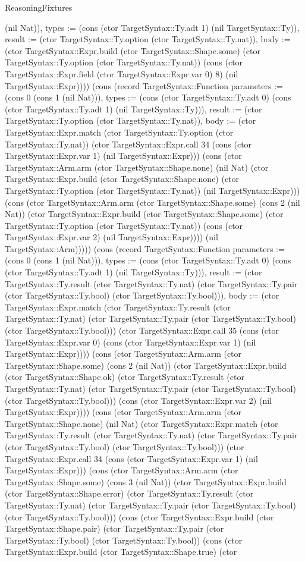 \begin{lexlean}{ReasoningFixtures}
\begin{semanticmodule}
{(nil Nat)), types := (cons (ctor TargetSyntax::Ty.adt 1) (nil TargetSyntax::Ty)), result := (ctor TargetSyntax::Ty.option (ctor TargetSyntax::Ty.nat)), body := (ctor TargetSyntax::Expr.build (ctor TargetSyntax::Shape.some) (ctor TargetSyntax::Ty.option (ctor TargetSyntax::Ty.nat)) (cons (ctor TargetSyntax::Expr.field (ctor TargetSyntax::Expr.var 0) 8) (nil TargetSyntax::Expr)))}) (cons (record TargetSyntax::Function {parameters := (cons 0 (cons 1 (nil Nat))), types := (cons (ctor TargetSyntax::Ty.adt 0) (cons (ctor TargetSyntax::Ty.adt 1) (nil TargetSyntax::Ty))), result := (ctor TargetSyntax::Ty.option (ctor TargetSyntax::Ty.nat)), body := (ctor TargetSyntax::Expr.match (ctor TargetSyntax::Ty.option (ctor TargetSyntax::Ty.nat)) (ctor TargetSyntax::Expr.call 34 (cons (ctor TargetSyntax::Expr.var 1) (nil TargetSyntax::Expr))) (cons (ctor TargetSyntax::Arm.arm (ctor TargetSyntax::Shape.none) (nil Nat) (ctor TargetSyntax::Expr.build (ctor TargetSyntax::Shape.none) (ctor TargetSyntax::Ty.option (ctor TargetSyntax::Ty.nat)) (nil TargetSyntax::Expr))) (cons (ctor TargetSyntax::Arm.arm (ctor TargetSyntax::Shape.some) (cons 2 (nil Nat)) (ctor TargetSyntax::Expr.build (ctor TargetSyntax::Shape.some) (ctor TargetSyntax::Ty.option (ctor TargetSyntax::Ty.nat)) (cons (ctor TargetSyntax::Expr.var 2) (nil TargetSyntax::Expr)))) (nil TargetSyntax::Arm))))}) (cons (record TargetSyntax::Function {parameters := (cons 0 (cons 1 (nil Nat))), types := (cons (ctor TargetSyntax::Ty.adt 0) (cons (ctor TargetSyntax::Ty.adt 1) (nil TargetSyntax::Ty))), result := (ctor TargetSyntax::Ty.result (ctor TargetSyntax::Ty.nat) (ctor TargetSyntax::Ty.pair (ctor TargetSyntax::Ty.bool) (ctor TargetSyntax::Ty.bool))), body := (ctor TargetSyntax::Expr.match (ctor TargetSyntax::Ty.result (ctor TargetSyntax::Ty.nat) (ctor TargetSyntax::Ty.pair (ctor TargetSyntax::Ty.bool) (ctor TargetSyntax::Ty.bool))) (ctor TargetSyntax::Expr.call 35 (cons (ctor TargetSyntax::Expr.var 0) (cons (ctor TargetSyntax::Expr.var 1) (nil TargetSyntax::Expr)))) (cons (ctor TargetSyntax::Arm.arm (ctor TargetSyntax::Shape.some) (cons 2 (nil Nat)) (ctor TargetSyntax::Expr.build (ctor TargetSyntax::Shape.ok) (ctor TargetSyntax::Ty.result (ctor TargetSyntax::Ty.nat) (ctor TargetSyntax::Ty.pair (ctor TargetSyntax::Ty.bool) (ctor TargetSyntax::Ty.bool))) (cons (ctor TargetSyntax::Expr.var 2) (nil TargetSyntax::Expr)))) (cons (ctor TargetSyntax::Arm.arm (ctor TargetSyntax::Shape.none) (nil Nat) (ctor TargetSyntax::Expr.match (ctor TargetSyntax::Ty.result (ctor TargetSyntax::Ty.nat) (ctor TargetSyntax::Ty.pair (ctor TargetSyntax::Ty.bool) (ctor TargetSyntax::Ty.bool))) (ctor TargetSyntax::Expr.call 34 (cons (ctor TargetSyntax::Expr.var 1) (nil TargetSyntax::Expr))) (cons (ctor TargetSyntax::Arm.arm (ctor TargetSyntax::Shape.some) (cons 3 (nil Nat)) (ctor TargetSyntax::Expr.build (ctor TargetSyntax::Shape.error) (ctor TargetSyntax::Ty.result (ctor TargetSyntax::Ty.nat) (ctor TargetSyntax::Ty.pair (ctor TargetSyntax::Ty.bool) (ctor TargetSyntax::Ty.bool))) (cons (ctor TargetSyntax::Expr.build (ctor TargetSyntax::Shape.pair) (ctor TargetSyntax::Ty.pair (ctor TargetSyntax::Ty.bool) (ctor TargetSyntax::Ty.bool)) (cons (ctor TargetSyntax::Expr.build (ctor TargetSyntax::Shape.true) (ctor }
\end{semanticmodule}
\end{lexlean}
